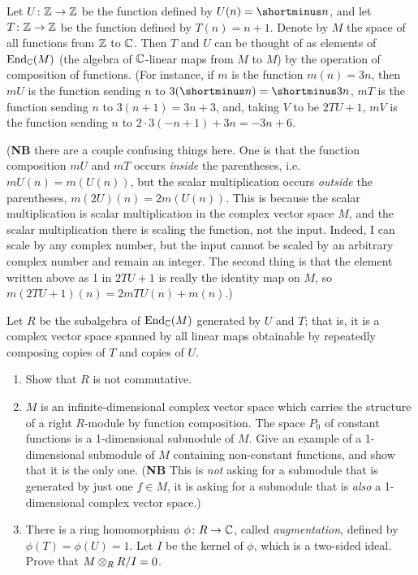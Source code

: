 \begin{question}[subtitle = {August 2020 Problem 5, edited},ID=Aug20_5]
Let $U \colon \mathbb{Z} \to \mathbb{Z}$ be the function defined by $U(n) = \shortminus n$, and let $T \colon \mathbb{Z} \to \mathbb{Z}$ be the function defined by $T(n) = n+1$. Denote by $M$ the space of all functions from $\mathbb{Z}$ to $\mathbb{C}$. Then $T$ and $U$ can be thought of as elements of $\operatorname{End}_{\mathbb{C}}(M)$ (the algebra of $\mathbb{C}$-linear maps from $M$ to $M$) by the operation of composition of functions. (For instance, if $m$ is the function $m(n) = 3n$, then $mU$ is the function sending $n$ to $3(\shortminus n) = \shortminus 3n$, $mT$ is the function sending $n$ to $3(n+1) = 3n+3$, and, taking $V$ to be $2TU + 1$, $mV$ is the function sending $n$ to $2\cdot 3(-n+1) + 3n = -3n + 6$.

(\textbf{NB} there are a couple confusing things here. One is that the function composition $mU$ and $mT$ occurs \emph{inside} the parentheses, i.e.\ $mU(n) = m(U(n))$, but the scalar multiplication occurs \emph{outside} the parentheses, $m(2U)(n) = 2m(U(n))$. This is because the scalar multiplication is scalar multiplication in the complex vector space $M$, and the scalar multiplication there is scaling the function, not the input. Indeed, I can scale by any complex number, but the input cannot be scaled by an arbitrary complex number and remain an integer. The second thing is that the element written above as 1 in $2TU+1$ is really the identity map on $M$, so $m(2TU+1)(n) = 2mTU(n) + m(n)$.)

Let $R$ be the subalgebra of $\operatorname{End}_{\mathbb{C}}(M)$ generated by $U$ and $T$; that is, it is a complex vector space spanned by all linear maps obtainable by repeatedly composing copies of $T$ and copies of $U$.
\begin{enumerate}
    \item Show that $R$ is not commutative.
    \item $M$ is an infinite-dimensional complex vector space which carries the structure of a right $R$-module by function composition. The space $P_0$ of constant functions is a 1-dimensional submodule of $M$. Give an example of a 1-dimensional submodule of $M$ containing non-constant functions, and show that it is the only one. (\textbf{NB} This is \emph{not} asking for a submodule that is generated by just one $f \in M$, it is asking for a submodule that is \emph{also} a 1-dimensional complex vector space.)
    \item There is a ring homomorphism $\phi \colon R \to \mathbb{C}$, called \emph{augmentation}, defined by $\phi(T) = \phi(U) = 1$. Let $I$ be the kernel of $\phi$, which is a two-sided ideal. Prove that $M \otimes_R R/I = 0$.
\end{enumerate}

\end{question}
